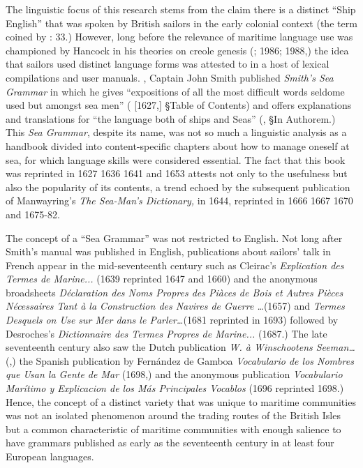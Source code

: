 \begin{styleNormali}
The linguistic focus of this research stems from the claim there is a distinct “Ship English” that was spoken by British sailors in the early colonial context (the term coined by \citealt{Hancock1976}: 33.) However, long before the relevance of maritime language use was championed by Hancock in his theories on creole genesis (\citealt{Hancock1972,19761972}; 1986; 1988,) the idea that sailors used distinct language forms was attested to in a host of lexical compilations and user manuals. \citealt{In1627}, Captain John Smith published \textit{Smith’s Sea Grammar} in which he gives “expositions of all the most difficult words seldome used but amongst sea men” (\citealt{Smith1968} [1627,] §Table of Contents) and offers explanations and translations for “the language both of ships and Seas” (\citealt{Smith1968}, §In Authorem.) This \textit{Sea Grammar}, despite its name, was not so much a linguistic analysis as a handbook divided into content-specific chapters about how to manage oneself at sea, for which language skills were considered essential. The fact that this book was reprinted in 1627 1636 1641 and 1653 attests not only to the usefulness but also the popularity of its contents, a trend echoed by the subsequent publication of Manwayring’s \textit{The Sea-Man’s Dictionary,} in 1644, reprinted in 1666 1667 1670 and 1675-82. 
\end{styleNormali}

\begin{styleNormali}
The concept of a “Sea Grammar” was not restricted to English. Not long after Smith’s manual was published in English, publications about sailors’ talk in French appear in the mid-seventeenth century such as Cleirac’s \textit{Explication des Termes de Marine...} (1639 reprinted 1647 and 1660) and the anonymous broadsheets \textit{Déclaration des Noms Propres des Piàces de Bois et Autres Pièces Nécessaires Tant à la Construction des Navires de Guerre …}(1657) and \textit{Termes Desquels on Use sur Mer dans le Parler…}(1681 reprinted in 1693) followed by Desroches’s \textit{Dictionnaire des Termes Propres de Marine...} (1687.) The late seventeenth century also saw the Dutch publication \textit{W. à Winschootens Seeman…} (\citealt{Winschooten1681},) the Spanish publication by Fernández de Gamboa \textit{Vocabulario de los Nombres que Usan la Gente de Mar} (1698,) and the anonymous publication \textit{Vocabulario Marítimo y Explicacion de los Más Principales Vocablos} (1696 reprinted 1698.) Hence, the concept of a distinct variety that was unique to maritime communities was not an isolated phenomenon around the trading routes of the British Isles but a common characteristic of maritime communities with enough salience to have grammars published as early as the seventeenth century in at least four European languages. 
\end{styleNormali}

